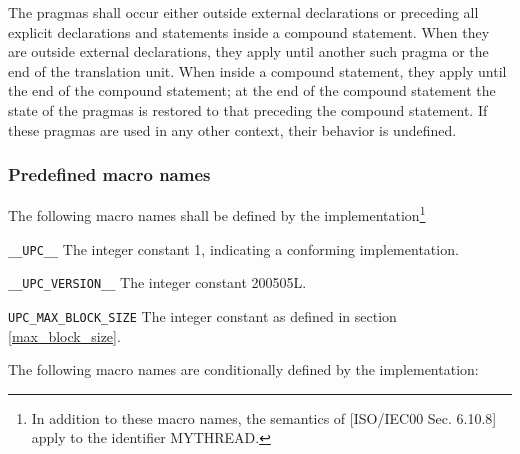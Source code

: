 \np %

\np The pragmas shall occur either outside external
    declarations or preceding all explicit declarations and statements
    inside a compound statement.  When they are outside external
    declarations, they apply until another such pragma or the end of
    the translation unit.  When inside a compound statement, they
    apply until the end of the compound statement; at the end of the
    compound statement the state of the pragmas is restored to that
    preceding the compound statement.  If these pragmas are used in
    any other context, their behavior is undefined.

\subsubsection{Predefined macro names}

\npf The following macro names shall be defined by the
    implementation\footnote{In addition to these macro names,
    the semantics of [ISO/IEC00 Sec. 6.10.8] apply to the identifier MYTHREAD.}

\begin{description}
\item{\tt \_\_UPC\_\_} 
The integer constant 1, indicating a conforming implementation.

\item{\tt \_\_UPC\_VERSION\_\_}
The integer constant 200505L.

\item{\tt UPC\_MAX\_BLOCK\_SIZE}
The integer constant as defined in section \ref{max_block_size}.
\end{description}

\np The following macro names are conditionally defined 
    by the implementation:

